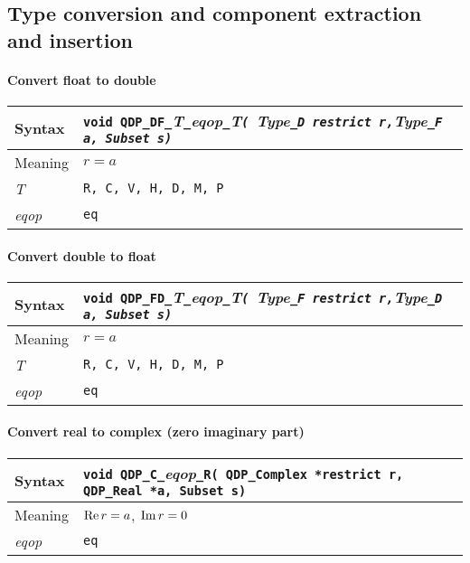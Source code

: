 \documentclass{article}
\renewcommand{\Re}{\mathop{\rm Re}}
\renewcommand{\Im}{\mathop{\rm Im}}
\newcommand{\tReal}{QDP\ttdash Real }
\newcommand{\tComplex}{QDP\ttdash Complex }
\newcommand{\namespace}{QDP}
\newcommand{\ttdash}{{\tt \_}}
\newcommand{\itt}{\it T}
\newcommand{\extraarg}{, Subset s}
\newcommand{\protoUnarySingleTypesCR}{{\tt void \namespace}\ttdash{\tt C}\ttdash{\it eqop}\ttdash{\tt R}{\tt ( \tComplex *restrict r, \tReal *a\extraarg)}}
\newcommand{\longdoubletodouble}{}
\begin{document}
\subsection{Type conversion and component extraction and insertion}

\paragraph{Convert float to double}
\begin{flushleft}
  \begin{tabular}{|l|l|}
  \hline
  Syntax      & {\tt void \namespace}\ttdash {\tt DF}\ttdash\itt\ttdash{\it eqop}\ttdash\itt{\tt ( }{\it Type}{\tt \_D }{\tt *restrict r,}{\it Type}{\tt \_F }{\tt *a\extraarg)} \\
  \hline
  Meaning     & $r = a$ \\
  \hline
  \itt     & {\tt R, C, V, H, D, M, P} \\
  \hline
  {\it eqop}  & {\tt eq} \\
  \hline
  \end{tabular}
\end{flushleft}

\paragraph{Convert double to float}
\begin{flushleft}
  \begin{tabular}{|l|l|}
  \hline
  Syntax      & {\tt void \namespace}\ttdash {\tt FD}\ttdash\itt\ttdash{\it eqop}\ttdash\itt{\tt ( }{\it Type}{\tt \_F }{\tt *restrict r,}{\it Type}{\tt \_D }{\tt *a\extraarg)} \\
  \hline
  Meaning     & $r = a$ \\
  \hline
  \itt     & {\tt R, C, V, H, D, M, P} \\
  \hline
  {\it eqop}  & {\tt eq} \\
  \hline
  \end{tabular}
\end{flushleft}

\longdoubletodouble

\paragraph{Convert real to complex (zero imaginary part)}

\begin{flushleft}
  \begin{tabular}{|l|l|}
  \hline
  Syntax      & \protoUnarySingleTypesCR \\
  \hline
  Meaning     & $\Re r = a$, $\Im r = 0$ \\
  \hline
  {\it eqop}  & {\tt eq} \\
  \hline
  \end{tabular}
\end{flushleft}
\end{document}
